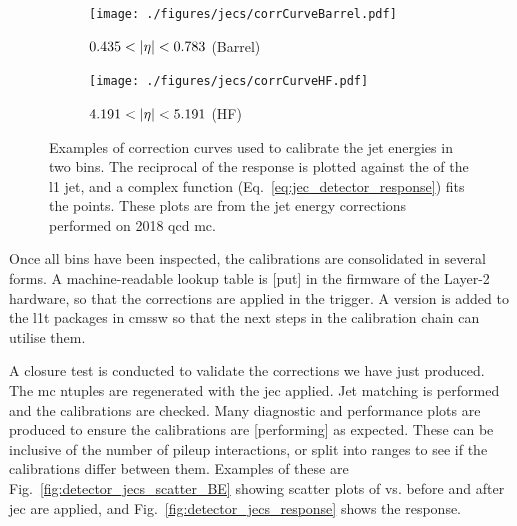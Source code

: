 \begin{figure}[htbp]
    \centering
    \begin{subfigure}[b]{0.45\textwidth}
        \texttt{[image: ./figures/jecs/corrCurveBarrel.pdf]}
        \caption{$0.435 < \lvert \eta \rvert < 0.783$ (Barrel)}
        \label{fig:detector_jecs_corr_curve_Barrel}
    \end{subfigure}
    \hfill
    \begin{subfigure}[b]{0.45\textwidth}
        \texttt{[image: ./figures/jecs/corrCurveHF.pdf]}
        \caption{$4.191 < \lvert \eta \rvert < 5.191$ (HF)}
        \label{fig:detector_jecs_corr_curve_HF}
    \end{subfigure}
\caption[Examples of correction curves used to calibrate the jet energies in two \abseta bins]{Examples of correction curves used to calibrate the jet energies in two \abseta bins. The reciprocal of the response is plotted against the \pt of the \acrlong{l1} jet, and a complex function (Eq.~\ref{eq:jec_detector_response}) fits the points. These plots are from the jet energy corrections performed on 2018 \acrshort{qcd} \acrlong{mc}.}
\label{fig:detector_jecs_corr_curves}
\end{figure}

Once all \abseta bins have been inspected, the calibrations are consolidated in several forms. A machine-readable lookup table is [put] in the firmware of the Layer-2 hardware, so that the corrections are applied in the trigger. A version is added to the \acrlong{l1t} packages in \acrshort{cmssw} so that the next steps in the calibration chain can utilise them.

A closure test is conducted to validate the corrections we have just produced. The \acrshort{mc} ntuples are regenerated with the \acrshort{jec} applied. Jet matching is performed and the calibrations are checked. Many diagnostic and performance plots are produced to ensure the calibrations are [performing] as expected. These can be inclusive of the number of pileup interactions, or split into ranges to see if the calibrations differ between them. Examples of these are Fig.~\ref{fig:detector_jecs_scatter_BE} showing scatter plots of \ptRef vs. \ptLOne before and after \acrshort{jec} are applied, and Fig.~\ref{fig:detector_jecs_response} shows the response.


